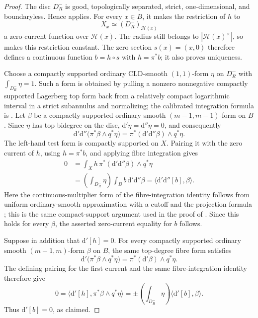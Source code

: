 \begin{proof}
The disc \(D_R^-\) is good, topologically separated, strict,
one-dimensional, and boundaryless.  Hence
 applies.  For
every \(x\in B\), it makes the restriction of \(h\) to
\[
                     X_x\simeq (D_R^-)_{\mathscr H(x)}
\]
a zero-current function over \(\mathscr H(x)\).  The radius still belongs
to \(|\mathscr H(x)^\times|\), so
 makes this restriction constant.
The zero section \(s(x)=(x,0)\) therefore defines a continuous function
\(b=h\circ s\) with \(h=\pi^*b\); it also proves uniqueness.

Choose a compactly supported ordinary CLD-smooth \((1,1)\)-form
\(\eta\) on \(D_R^-\) with \(\int_{D_R^-}\eta=1\).  Such a form is
obtained by pulling a nonzero nonnegative compactly supported Lagerberg top
form back from a relatively compact logarithmic interval in a strict
subannulus and normalizing; the calibrated integration formula is
\cite[Proposition~11.1 and Example~11.7]{GJR26}.  Let \(\beta\) be a
compactly supported ordinary smooth \((m-1,m-1)\)-form on \(B\).  Since
\(\eta\) has top bidegree on the disc,
\(\mathrm d'\eta=\mathrm d''\eta=0\), and consequently
\[
 \mathrm d'\mathrm d''\bigl(\pi^*\beta\wedge q^*\eta\bigr)
       =\pi^*(\mathrm d'\mathrm d''\beta)\wedge q^*\eta.
\]
The left-hand test form is compactly supported on \(X\).  Pairing it with
the zero current of \(h\), using \(h=\pi^*b\), and applying fibre
integration gives
\[
 \begin{aligned}
 0
 &=\int_X h\,\pi^*(\mathrm d'\mathrm d''\beta)\wedge q^*\eta\\
 &=\left(\int_{D_R^-}\eta\right)
   \int_B b\,\mathrm d'\mathrm d''\beta
  =\bigl\langle\mathrm d'\mathrm d''[b],\beta\bigr\rangle.
 \end{aligned}
\]
Here the continuous-multiplier form of the fibre-integration identity
follows from uniform ordinary-smooth approximation with a cutoff and the
projection formula \cite[Theorem~16.5.4 and Corollary~16.5.5]{CLD25}; this
is the same compact-support argument used in the proof of
.  Since this holds
for every \(\beta\), the asserted zero-current equality for \(b\) follows.

Suppose in addition that \(\mathrm d'[h]=0\).  For every compactly
supported ordinary smooth \((m-1,m)\)-form \(\beta\) on \(B\), the same
top-degree fibre form satisfies
\[
 \mathrm d'\bigl(\pi^*\beta\wedge q^*\eta\bigr)
       =\pi^*(\mathrm d'\beta)\wedge q^*\eta.
\]
The defining pairing for the first current and the same fibre-integration
identity therefore give
\[
 0=\bigl\langle\mathrm d'[h],\pi^*\beta\wedge q^*\eta\bigr\rangle
   =\mathord\pm\left(\int_{D_R^-}\eta\right)
      \bigl\langle\mathrm d'[b],\beta\bigr\rangle.
\]
Thus \(\mathrm d'[b]=0\), as claimed.
\end{proof}


